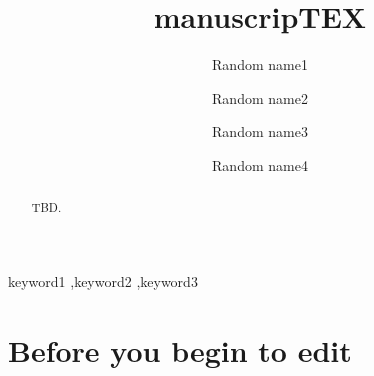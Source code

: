 \documentclass[preprint]{elsarticle}
\begin{document}

\begin{frontmatter}

\title{manuscripTEX}

\author[U]{Random name1}
\author[U]{Random name2}
\author[I]{Random name3}
\author[U]{Random name4}

\address[U]{University, Utopia}
\address[I]{National Lab, Utopia}

\begin{abstract}
TBD.
\end{abstract}

\begin{keyword}
keyword1 \sep keyword2 \sep keyword3
\end{keyword}

\end{frontmatter}

\linenumbers

\graphicspath{ {figures/} }


\section{Before you begin to edit}
\end{document}
